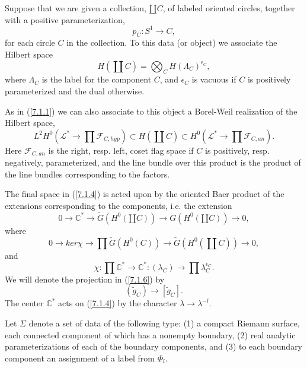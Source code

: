 \documentclass{amsart}
\theoremstyle{conjecture}
\theoremstyle{definition}
\theoremstyle{question}
\theoremstyle{questions}
\theoremstyle{remark}
\theoremstyle{remarks}
\theoremstyle{example}
\numberwithin{equation}{section}
\begin{document}
Suppose that we are given a collection, $\amalg C$, of labeled
oriented circles, together with a positive parameterization,
\begin{equation}p_C:S^1\to C, \label{7.1.2}\end{equation}
for each circle $C$ in the collection.  To this data (or
object) we associate the Hilbert space
\begin{equation}H(\coprod C)=\bigotimes_CH(\Lambda_C)^{\epsilon_C}, \label{7.1.3}\end{equation}
where $\Lambda_C$ is the label for the component $C$, and $\epsilon_
C$ is
vacuous if $C$ is positively parameterized and the dual
otherwise.

As in (\ref{7.1.1}) we can also associate to this object a
Borel-Weil realization of the Hilbert space,
$$L^2H^0(\mathcal L^{*}\to\prod \mathcal F_{C,hyp})\subset H(\coprod C
)\subset H^0(\mathcal L^{*}\to\prod \mathcal F_{C,an}). \label{7.1.4}$$
Here $\mathcal F_{C,an}$ is the right, resp.  left, coset flag space if
$C$ is positively, resp.  negatively, parameterized, and the
line bundle over this product is the product of the line
bundles corresponding to the factors.

The final space in (\ref{7.1.4}) is acted upon by the oriented
Baer product of the extensions corresponding to the
components, i.e.  the extension
\begin{equation}0\to \mathbb C^{*}\to\tilde {G}(H^0(\amalg C))\to G(H^0(\amalg
C))\to 0,\label{ 7.1.5}\end{equation}
where
\begin{equation}0\to ker\chi\to\prod\tilde {G}(H^0(C))\to\tilde {G}(H^0(\coprod
C))\to 0, \label{7.1.6}\end{equation}
and
\begin{equation}\chi :\prod \mathbb C^{*}\to \mathbb C^{*}:(\lambda_C)\to\prod\lambda_
C^{\epsilon_C}. \label{7.1.7}\end{equation}
We will denote the projection in (\ref{7.1.6}) by
\begin{equation}(\tilde {g}_C)\to [\tilde {g}_C].\label{ 7.1.8}\end{equation}
The center $\mathbb C^{*}$ acts on (\ref{7.1.4}) by the character $\lambda
\to\lambda^{-l}$.

Let $\Sigma$ denote a set of data of the
following type:  (1) a compact Riemann surface, each
connected component of which has a nonempty boundary,
(2) real analytic parameterizations of each of the
boundary components, and (3) to each boundary
component an assignment of a label from $\Phi_l$.
\end{document}
